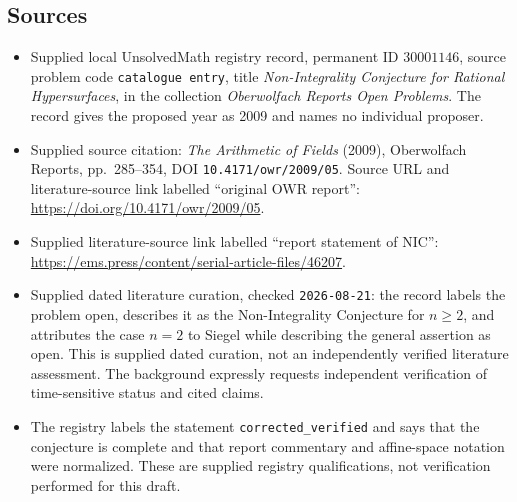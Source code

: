 \documentclass[11pt]{article}
\begin{document}
\subsection{Sources}
\begin{itemize}
\item Supplied local UnsolvedMath registry record, permanent ID \(30001146\), source problem code \texttt{catalogue entry}, title \emph{Non-Integrality Conjecture for Rational Hypersurfaces}, in the collection \emph{Oberwolfach Reports Open Problems}. The record gives the proposed year as 2009 and names no individual proposer.
\item Supplied source citation: \emph{The Arithmetic of Fields} (2009), Oberwolfach Reports, pp.~285--354, DOI \texttt{10.4171/owr/2009/05}. Source URL and literature-source link labelled ``original OWR report'': \url{https://doi.org/10.4171/owr/2009/05}.
\item Supplied literature-source link labelled ``report statement of NIC'': \url{https://ems.press/content/serial-article-files/46207}.
\item Supplied dated literature curation, checked \texttt{2026-08-21}: the record labels the problem open, describes it as the Non-Integrality Conjecture for \(n\geq2\), and attributes the case \(n=2\) to Siegel while describing the general assertion as open. This is supplied dated curation, not an independently verified literature assessment. The background expressly requests independent verification of time-sensitive status and cited claims.
\item The registry labels the statement \texttt{corrected\_verified} and says that the conjecture is complete and that report commentary and affine-space notation were normalized. These are supplied registry qualifications, not verification performed for this draft.
\end{itemize}
\end{document}

